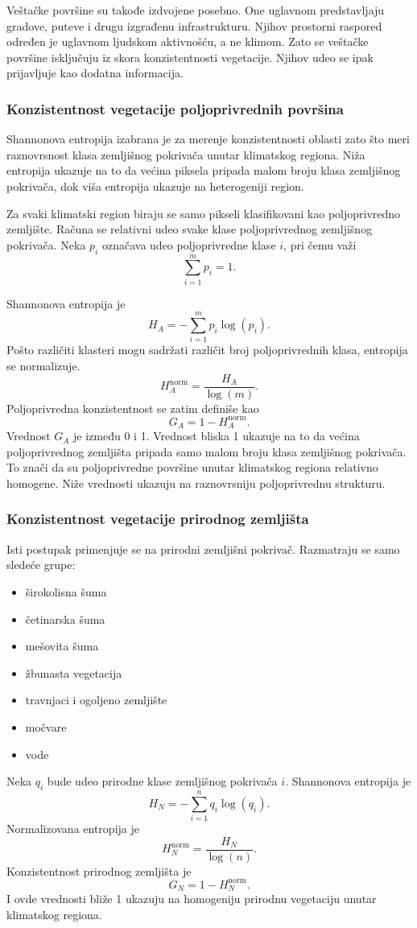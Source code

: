 \documentclass[11pt]{article}
\begin{document}
Veštačke površine su takođe izdvojene posebno. One uglavnom predstavljaju gradove, puteve i drugu izgrađenu infrastrukturu. Njihov prostorni raspored određen je uglavnom ljudskom aktivnošću, a ne klimom. Zato se veštačke površine isključuju iz skora konzistentnosti vegetacije. Njihov udeo se ipak prijavljuje kao dodatna informacija.

\subsubsection{Konzistentnost vegetacije poljoprivrednih površina}
Shannonova entropija izabrana je za merenje konzistentnosti oblasti zato što meri raznovrsnost klasa zemljišnog pokrivača unutar klimatskog regiona. Niža entropija ukazuje na to da većina piksela pripada malom broju klasa zemljišnog pokrivača, dok viša entropija ukazuje na heterogeniji region.

Za svaki klimatski region biraju se samo pikseli klasifikovani kao poljoprivredno zemljište. Računa se relativni udeo svake klase poljoprivrednog zemljišnog pokrivača. Neka $p_i$ označava udeo poljoprivredne klase $i$, pri čemu važi
\[
\sum_{i=1}^{m} p_i = 1.
\]

Shannonova entropija je
\[
H_A=-\sum_{i=1}^{m} p_i \log(p_i).
\]
Pošto različiti klasteri mogu sadržati različit broj poljoprivrednih klasa, entropija se normalizuje.
\[
H_A^{\mathrm{norm}}
=
\frac{H_A}{\log(m)}.
\]
Poljoprivredna konzistentnost se zatim definiše kao
\[
G_A
=
1-H_A^{\mathrm{norm}}.
\]
Vrednost $G_A$ je između 0 i 1. Vrednost bliska 1 ukazuje na to da većina poljoprivrednog zemljišta pripada samo malom broju klasa zemljišnog pokrivača. To znači da su poljoprivredne površine unutar klimatskog regiona relativno homogene. Niže vrednosti ukazuju na raznovrsniju poljoprivrednu strukturu.

\subsubsection{Konzistentnost vegetacije prirodnog zemljišta}
Isti postupak primenjuje se na prirodni zemljišni pokrivač. Razmatraju se samo sledeće grupe:
\begin{itemize}
  \item širokolisna šuma
  \item četinarska šuma
  \item mešovita šuma
  \item žbunasta vegetacija
  \item travnjaci i ogoljeno zemljište
  \item močvare
  \item vode
\end{itemize}
Neka $q_i$ bude udeo prirodne klase zemljišnog pokrivača $i$. Shannonova entropija je
\[
H_N=-\sum_{i=1}^{n} q_i \log(q_i).
\]
Normalizovana entropija je
\[
H_N^{\mathrm{norm}}
=
\frac{H_N}{\log(n)}.
\]
Konzistentnost prirodnog zemljišta je
\[
G_N
=
1-H_N^{\mathrm{norm}}.
\]
I ovde vrednosti bliže 1 ukazuju na homogeniju prirodnu vegetaciju unutar klimatskog regiona.
\end{document}
